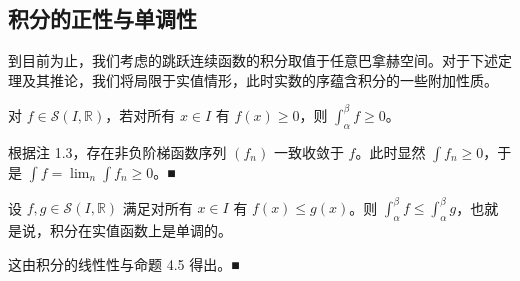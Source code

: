\subsection*{积分的正性与单调性}

到目前为止，我们考虑的跳跃连续函数的积分取值于任意巴拿赫空间。对于下述定理及其推论，我们将局限于实值情形，此时实数的序蕴含积分的一些附加性质。

\begin{theorem}

对 $ f \in \mathcal{S}(I, \mathbb{R}) $，若对所有 $ x \in I $ 有 $ f(x) \ge 0 $，则 $ \int_{\alpha}^{\beta} f \ge 0 $。

\proofhead
根据注 1.3，存在非负阶梯函数序列 $ (f_n) $ 一致收敛于 $ f $。此时显然 $ \int f_n \ge 0 $，于是 $ \int f = \lim_{n} \int f_n \ge 0 $。\nobreak\hspace{0.35em}■
\end{theorem}

\begin{corollary}

设 $ f, g \in \mathcal{S}(I, \mathbb{R}) $ 满足对所有 $ x \in I $ 有 $ f(x) \le g(x) $。则 $ \int_{\alpha}^{\beta} f \le \int_{\alpha}^{\beta} g $，也就是说，积分在实值函数上是单调的。

\proofhead
这由积分的线性性与命题 4.5 得出。\nobreak\hspace{0.35em}■
\end{corollary}

